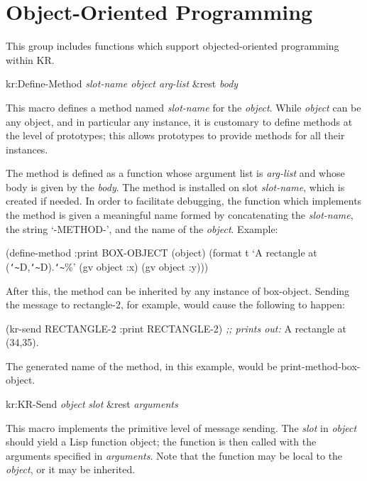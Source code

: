 \section{Object-Oriented Programming}
\value{s-top}

This group includes functions which support objected-oriented
programming within KR.


\value{f-top}
\begin{example}
kr:Define-Method {\it slot-name object arg-list} \&rest {\it body}\value{macro}
\end{example}

This macro defines a method named {\it slot-name} for the
{\it object}.  While {\it object} can be any object, and in particular any
instance, it is customary to define methods at the level of prototypes;
this allows prototypes to provide methods for all their instances.

The method is defined as a function whose argument list is {\it arg-list} and
whose body is given by the {\it body}.  The method is installed on slot
{\it slot-name}, which is created if needed.  In order to facilitate debugging,
the function which implements the method is given a meaningful name formed
by concatenating the {\it slot-name}, the string `-METHOD-', and the name of the
{\it object}.  Example:
\begin{programexample}
(define-method :print BOX-OBJECT (object)
  (format t `A rectangle at ({\tt\char`\~}D,{\tt\char`\~}D).{\tt\char`\~}\%'
    (gv object :x) (gv object :y)))
\end{programexample}
After this, the  method can be inherited by any instance of
{\sc box-object}.  Sending the message to {\sc rectangle-2}, for example, would
cause the following to happen:
\begin{programexample}
(kr-send RECTANGLE-2 :print RECTANGLE-2)
{\it ;; prints out:}
A rectangle at (34,35).
\end{programexample}
The generated name of the  method, in this example,
would be {\sc print-method-box-object}.



\value{f-top}
\begin{example}
kr:KR-Send {\it object} {\it slot} \&rest {\it arguments}\value{macro}
\end{example}

This macro implements the primitive level of message sending.  The
{\it slot} in {\it object} should yield a Lisp function
object; the function is then called with the arguments specified in
{\it arguments}.  Note that the function may be local to the {\it object}, or
it may be inherited.

